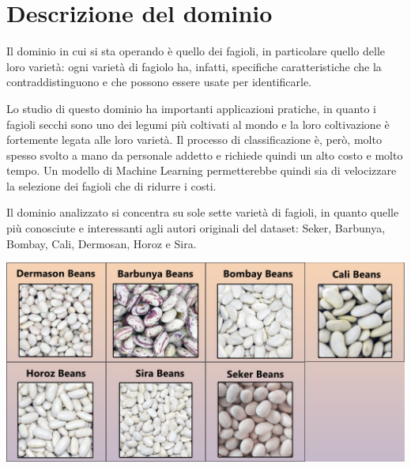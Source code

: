\section{Descrizione del dominio}

Il dominio in cui si sta operando è quello dei fagioli, in particolare quello
delle loro varietà: ogni varietà di fagiolo ha, infatti, specifiche
caratteristiche che la contraddistinguono e che possono essere usate per
identificarle.

Lo studio di questo dominio ha importanti applicazioni pratiche, in 
quanto i fagioli secchi sono uno dei legumi più coltivati al mondo e la loro
coltivazione è fortemente legata alle loro varietà. 
Il processo di classificazione è, però, molto spesso svolto a mano 
da personale addetto e richiede quindi un alto costo e molto tempo.
Un modello di Machine Learning permetterebbe
quindi sia di velocizzare la selezione dei fagioli che di ridurre i costi.

Il dominio analizzato si concentra su sole sette varietà di fagioli, in quanto
quelle più conosciute e interessanti agli autori originali del dataset:
Seker, Barbunya, Bombay, Cali, Dermosan, Horoz e Sira.

\begin{Figure}
    \centering
    \includegraphics[width=\linewidth]{img/dry_beans.png}
\end{Figure}